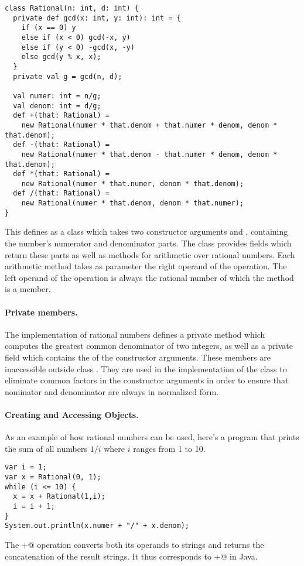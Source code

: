 \documentclass[11pt]{book}
\begin{document}
\begin{verbatim}
class Rational(n: int, d: int) {
  private def gcd(x: int, y: int): int = {
    if (x == 0) y
    else if (x < 0) gcd(-x, y)
    else if (y < 0) -gcd(x, -y)
    else gcd(y % x, x);
  }
  private val g = gcd(n, d);

  val numer: int = n/g;
  val denom: int = d/g;
  def +(that: Rational) =
    new Rational(numer * that.denom + that.numer * denom, denom * that.denom);
  def -(that: Rational) =
    new Rational(numer * that.denom - that.numer * denom, denom * that.denom);
  def *(that: Rational) =
    new Rational(numer * that.numer, denom * that.denom);
  def /(that: Rational) =
    new Rational(numer * that.denom, denom * that.numer);
}
\end{verbatim}
This defines \verb@Rational@ as a class which takes two constructor
arguments \verb@n@ and \verb@d@, containing the number's numerator and
denominator parts.  The class provides fields which return these parts
as well as methods for arithmetic over rational numbers.  Each
arithmetic method takes as parameter the right operand of the
operation. The left operand of the operation is always the rational
number of which the method is a member.

\paragraph{Private members.}
The implementation of rational numbers defines a private method
\verb@gcd@ which computes the greatest common denominator of two
integers, as well as a private field \verb@g@ which contains the
\verb@gcd@ of the constructor arguments. These members are inaccessible
outside class \verb@Rational@. They are used in the implementation of
the class to eliminate common factors in the constructor arguments in
order to ensure that nominator and denominator are always in
normalized form.

\paragraph{Creating and Accessing Objects.}
As an example of how rational numbers can be used, here's a program
that prints the sum of all numbers $1/i$ where $i$ ranges from 1 to 10.
\begin{verbatim}
var i = 1;
var x = Rational(0, 1);
while (i <= 10) {
  x = x + Rational(1,i);
  i = i + 1;
}
System.out.println(x.numer + "/" + x.denom);
\end{verbatim}
The \verb@+@ operation converts both its operands to strings and returns the
concatenation of the result strings. It thus corresponds to \verb@+@ in Java. 
  
\end{document}
